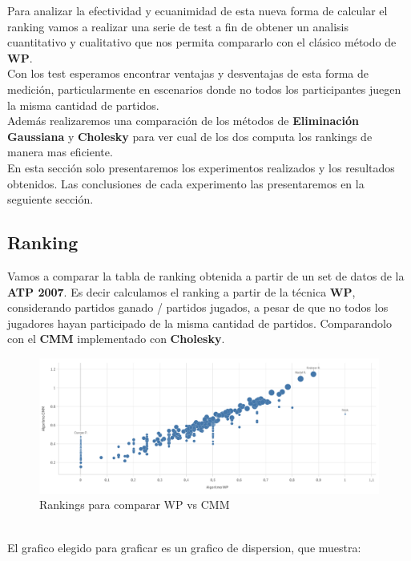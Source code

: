 Para analizar la efectividad y ecuanimidad de esta nueva forma de calcular el ranking vamos a realizar una serie de test a fin de obtener un analisis cuantitativo y cualitativo que nos permita compararlo con el clásico método de \textbf{WP}. \\
Con los test esperamos encontrar ventajas y desventajas de esta forma de medición, particularmente en escenarios donde no todos los participantes juegen la misma cantidad de partidos.
\\

Además realizaremos una comparación de los métodos de \textbf{Eliminación Gaussiana} y \textbf{Cholesky} para ver cual de los dos computa los rankings de manera mas eficiente.
\\

En esta sección solo presentaremos los experimentos realizados y los resultados obtenidos. Las conclusiones de cada experimento
las presentaremos en la seguiente sección. 


\subsection{Ranking}

Vamos a comparar la tabla de ranking obtenida a partir de un set de datos de la \textbf{ATP 2007}. Es decir calculamos el ranking a partir de la técnica \textbf{WP}, considerando partidos ganado / partidos jugados, a pesar de que no todos los jugadores hayan participado de la misma cantidad de partidos. Comparandolo con el \textbf{CMM} implementado con \textbf{Cholesky}. \\


\begin{figure}[H]
\centering
\includegraphics[width=1\textwidth]{IMG/Comparativa WP- CMM todos.png}
\caption{Rankings para comparar WP vs CMM}
\label{fig:Comparacion de tecnicas}
\end{figure}

\\
El grafico elegido para graficar es un grafico de dispersion, que muestra: \\

